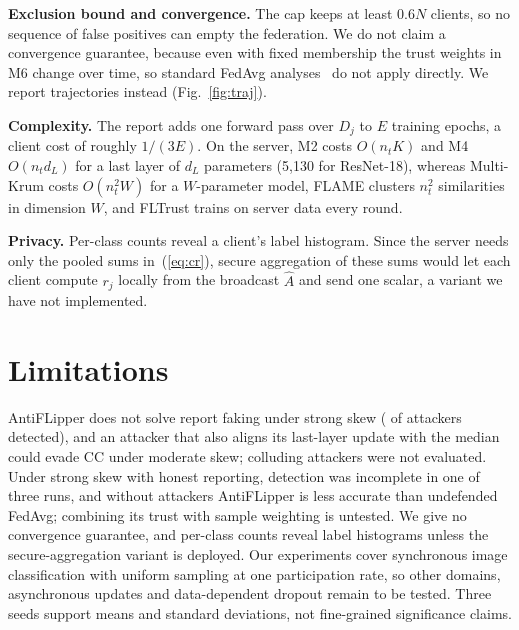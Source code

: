 \documentclass[conference]{IEEEtran}
\begin{document}
\textbf{Exclusion bound and convergence.} The cap keeps at least $0.6N$ clients, so no sequence of false positives can empty the federation. We do not claim a convergence guarantee, because even with fixed membership the trust weights in M6 change over time, so standard FedAvg analyses~\cite{li2020convergence} do not apply directly. We report trajectories instead (Fig.~\ref{fig:traj}).

\textbf{Complexity.} The report adds one forward pass over $D_j$ to $E$ training epochs, a client cost of roughly $1/(3E)$. On the server, M2 costs $O(n_tK)$ and M4 $O(n_t d_L)$ for a last layer of $d_L$ parameters (5{,}130 for ResNet-18), whereas Multi-Krum costs $O(n_t^2W)$ for a $W$-parameter model, FLAME clusters $n_t^2$ similarities in dimension $W$, and FLTrust trains on server data every round.

\textbf{Privacy.} Per-class counts reveal a client's label histogram. Since the server needs only the pooled sums in~(\ref{eq:cr}), secure aggregation of these sums would let each client compute $r_j$ locally from the broadcast $\hat A$ and send one scalar, a variant we have not implemented.

\section{Limitations}
\label{sec:limits}
AntiFLipper does not solve report faking under strong skew (\fsFound{} of \fsTotal{} attackers detected), and an attacker that also aligns its last-layer update with the median could evade CC under moderate skew; colluding attackers were not evaluated. Under strong skew with honest reporting, detection was incomplete in one of three runs, and without attackers AntiFLipper is less accurate than undefended FedAvg; combining its trust with sample weighting is untested. We give no convergence guarantee, and per-class counts reveal label histograms unless the secure-aggregation variant is deployed. Our experiments cover synchronous image classification with uniform sampling at one participation rate, so other domains, asynchronous updates and data-dependent dropout remain to be tested. Three seeds support means and standard deviations, not fine-grained significance claims.

\end{document}
